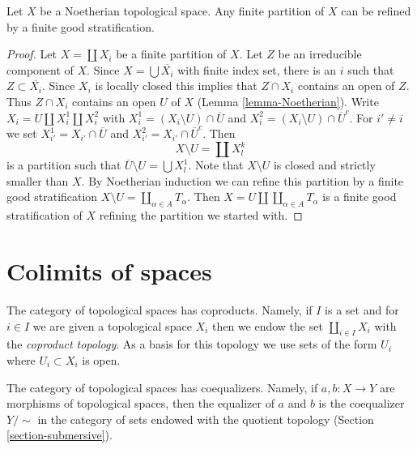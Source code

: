 \begin{lemma}
\label{lemma-noetherian-partition-refined-by-stratification}
Let $X$ be a Noetherian topological space. Any finite partition
of $X$ can be refined by a finite good stratification.
\end{lemma}

\begin{proof}
Let $X = \coprod X_i$ be a finite partition of $X$.
Let $Z$ be an irreducible component of $X$. Since $X = \bigcup \overline{X_i}$
with finite index set, there is an $i$ such that
$Z \subset \overline{X_i}$. Since $X_i$ is locally closed this
implies that $Z \cap X_i$ contains an open of $Z$. Thus
$Z \cap X_i$ contains an open $U$ of $X$ (Lemma \ref{lemma-Noetherian}).
Write $X_i = U \amalg X_i^1 \amalg X_i^2$ with
$X_i^1 = (X_i \setminus U) \cap \overline{U}$ and
$X_i^2 = (X_i \setminus U) \cap \overline{U}^c$.
For $i' \not = i$ we set
$X_{i'}^1 = X_{i'} \cap \overline{U}$ and
$X_{i'}^2 = X_{i'} \cap \overline{U}^c$.
Then
$$
X \setminus U = \coprod X^k_l
$$
is a partition such that $\overline{U} \setminus U = \bigcup X_l^1$.
Note that $X \setminus U$ is closed and strictly smaller than $X$.
By Noetherian induction we can refine this partition
by a finite good stratification
$X \setminus U = \coprod_{\alpha \in A} T_\alpha$.
Then $X = U \amalg \coprod_{\alpha \in A} T_\alpha$ is a finite
good stratification of $X$ refining the partition we started with.
\end{proof}







\section{Colimits of spaces}
\label{section-colimits}

\noindent
The category of topological spaces has coproducts. Namely, if $I$ is a set
and for $i \in I$ we are given a topological space $X_i$ then we endow
the set $\coprod_{i \in I} X_i$ with the {\it coproduct topology}.
As a basis for this topology we use sets of the form $U_i$ where
$U_i \subset X_i$ is open.

\medskip\noindent
The category of topological spaces has coequalizers. Namely, if
$a, b : X \to Y$ are morphisms of topological spaces, then the
equalizer of $a$ and $b$ is the coequalizer $Y/\sim$ in the category
of sets endowed with the quotient topology (Section \ref{section-submersive}).

